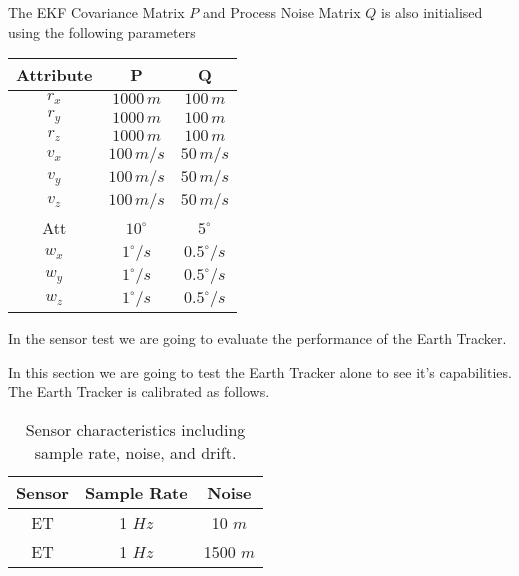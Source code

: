 \noindent
The EKF Covariance Matrix $P$ and Process Noise Matrix $Q$ is also initialised using the following parameters

\begin{table}[H]
    \centering
    \begin{tabular}{|c|c|c|}
        \hline
        \textbf{Attribute} & \textbf{P} & \textbf{Q} \\
        \hline
        $r_x$ & $1000 \, m$ &  $100 \, m$\\
        $r_y$ & $1000 \, m$ &  $100 \, m$\\
        $r_z$ & $1000 \, m$ &  $100 \, m$\\
        \hline
        $v_x$ & $100 \, m/s$ & $50 \, m/s$ \\
        $v_y$ & $100 \, m/s$ & $50 \, m/s$ \\
        $v_z$ & $100 \, m/s$ & $50 \, m/s$ \\
        \hline
        Att   & $10 ^{\circ} $ & $5 ^{\circ}$ \\
        \hline
        $w_x$ & $1 ^{\circ}/s$ &  $0.5 ^{\circ}/s$ \\
        $w_y$ & $1 ^{\circ}/s$ &  $0.5 ^{\circ}/s$ \\
        $w_z$ & $1 ^{\circ}/s$ &  $0.5 ^{\circ}/s$ \\
        \hline
    \end{tabular}
\end{table}


\label{sec:SensorTest}

In the sensor test we are going to evaluate the performance of the Earth Tracker.


In this section we are going to test the Earth Tracker alone to see it's capabilities.
The Earth Tracker is calibrated as follows.

\begin{table}[H]
\centering
\begin{tabular}{|c|c|c|}
\hline
\textbf{Sensor} & \textbf{Sample Rate} & \textbf{Noise} \\ \hline
ET  &  1 $Hz$ & 10 $m$ \\ \hline
ET  &  1 $Hz$ & 1500 $m$ \\ \hline
\end{tabular}
\caption{Sensor characteristics including sample rate, noise, and drift.}
\label{tab:ET_characteristics}
\end{table}

